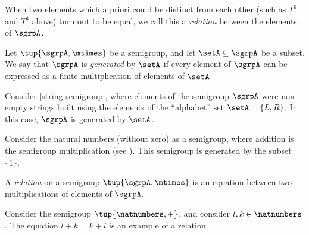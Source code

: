 When two elements which a priori could be distinct from each other (such as $T^6$ and $T^4$ above) turn out to be equal, we call this a \emph{relation} between the elements of $\sgrpA$.

\begin{definition}
Let $\tup{\sgrpA, \mtimes}$ be a semigroup, and let $\setA \subseteq \sgrpA$ be a subset. We say that $\sgrpA$ is \emph{generated} by $\setA$ if every element of $\sgrpA$ can be expressed as a finite multiplication of elements of $\setA$.
\end{definition}

\begin{example}
Consider \cref{string-semigroup}, where elements of the semigroup $\sgrpA$ were non-empty strings built using the elements of the ``alphabet'' set $\setA = \{ L, R \}$. In this case, $\sgrpA$ is generated by $\setA$.
\end{example}


\begin{example}
Consider the natural numbers (without zero) as a semigroup, where addition is the semigroup multiplication (see \label{natnum-semigroup}). This semigroup is generated by the subset $\{1 \}$.
\end{example}

\begin{definition}
A \emph{relation} on a semigroup $\tup{\sgrpA, \mtimes}$ is an equation between two multiplications of elements of $\sgrpA$.
\end{definition}

\begin{example}
Consider the semigroup $\tup{\natnumbers, +}$, and consider $l, k \in \natnumbers$. The equation $l + k = k + l$ is an example of  a relation. 
\end{example}


\


